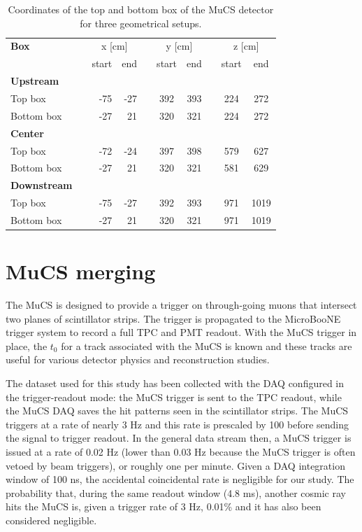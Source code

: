 \documentclass[a4paper]{scrartcl}
\renewcommand{\arraystretch}{1.2}
\newcommand{\ra}[1]{\renewcommand{\arraystretch}{#1}}
\begin{document}
\begin{table}[htbp]
  \centering
  \ra{1.2}
  \begin{tabular}{lcrrrccccc}
    \toprule
    \textbf{Box} & \phantom{abc}& \multicolumn{2}{c}{x [cm]} & \phantom{abc} & \multicolumn{2}{c}{y [cm]} & \phantom{abc} & \multicolumn{2}{c}{z [cm]}\\
    \cmidrule{3-4} \cmidrule{6-7} \cmidrule{9-10}
    & & start & end & & start & end & & start & end\\
    \midrule

    \textbf{Upstream} & & & & & & & & & \\
    Top box & & -75 & -27 & & 392 & 393 & & 224 & 272\\
    Bottom box & & -27 & 21 & & 320 & 321 & & 224 & 272\\

    \midrule
    \textbf{Center} & & & & & & & & & \\
    Top box & & -72 & -24 & & 397 & 398 & & 579 & 627\\
    Bottom box & & -27 & 21 & & 320 & 321 & & 581 & 629\\
    \midrule
    \textbf{Downstream} & & & & & & & & & \\
    Top box & & -75 & -27 & & 392 & 393 & & 971 & 1019\\
    Bottom box & & -27 & 21 & & 320 & 321 & & 971 & 1019\\
    \bottomrule

  \end{tabular}
  \caption{Coordinates of the top and bottom box of the MuCS detector for three geometrical setups.}\label{tab:mucs}
\end{table}


\section{MuCS merging}
The MuCS is designed to provide a trigger on through-going muons that intersect two planes of scintillator strips. The trigger is propagated to the MicroBooNE trigger system to record a full TPC and PMT readout. With the MuCS trigger in place, the $t_0$ for a track associated with the MuCS is known and these tracks are useful for various detector physics and reconstruction studies.

The dataset used for this study has been collected with the DAQ configured in the trigger-readout mode: the MuCS trigger is sent to the TPC readout, while the MuCS DAQ saves the hit patterns seen in the scintillator strips.
The MuCS triggers at a rate of nearly 3 Hz and this rate is prescaled by 100 before sending the signal to trigger readout. In the general data stream then, a MuCS trigger is issued at a rate of 0.02 Hz (lower than 0.03 Hz because the MuCS trigger is often vetoed by beam triggers), or roughly one per minute.
Given a DAQ integration window of 100 ns, the accidental coincidental rate is negligible for our study. The probability that, during the same readout window (4.8 ms), another cosmic ray hits the MuCS is, given a trigger rate of 3 Hz, 0.01\% and it has also been considered negligible.
\end{document}
